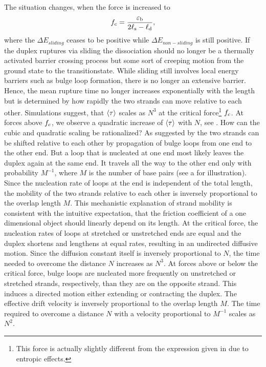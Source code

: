 The situation changes, when the force is increased to
\begin{equation}
\label{eq:sliding_fc_estimate}
{f_c}=\frac{{\varepsilon_{\rm b}}}{2{\ell_{\rm s}}-{\ell_{\rm d}}},
\end{equation}
where the $\Delta E_{sliding}$ ceases to be positive while  $\Delta E_{non-sliding}$
is still positive. If the duplex ruptures via sliding the dissociation should no longer be 
a thermally activated barrier crossing process but some sort of creeping motion from the ground state
to the transitionstate.  While sliding still involves local energy barriers such as bulge loop formation, 
there is no longer an extensive barrier. Hence, the mean rupture time no longer increases exponentially
with the length but is determined by how rapidly the two strands can move relative to each other. 
Simulations suggest, that $\langle \tau \rangle$ scales as $N^3$ at the critical force\footnote{
This force is actually slightly different from the expression given in 
due to entropic effects.} ${f_c}$.
At forces above ${f_c}$, we observe a quadratic increase of $\langle \tau \rangle$ with $N$, see .
How can the cubic and quadratic scaling be rationalized?
As suggested by \citeauthor{Poerschke_BioPhysChem_74a} the two strands can be shifted relative 
to each other by propagation of bulge loops from one end to the 
other end. But a loop that is nucleated at one end most likely leaves the duplex again at the same end.
It travels all the way to the other end only with probability $M^{-1}$, where $M$ is the  
number of base pairs (see a for illustration).
Since the nucleation rate of loops at the end is independent of the total length, the mobility of 
the two strands relative to each other is inversely proportional to the overlap length $M$.
This mechanistic explanation of strand mobility is consistent with the intuitive expectation, that
the friction coefficient of a one dimensional object should linearly depend on its length.
At the critical force, the nucleation rates of loops at stretched or unstretched ends are equal and 
the duplex shortens and lengthens at equal rates, resulting in an undirected diffusive motion.
Since the diffusion constant itself is inversely proportional to $N$, the time needed to overcome 
the distance $N$ increases as $N^{3}$. 
At forces above or below the critical force, bulge loops are 
nucleated more frequently on unstretched or stretched strands, respectively, than they are on the
opposite strand. This induces a directed motion either extending or contracting the duplex. The effective
drift velocity is inversely proportional to the overlap length $M$. The time required to overcome a
distance $N$ with a velocity proportional to $M^{-1}$ scales as $N^2$. 

